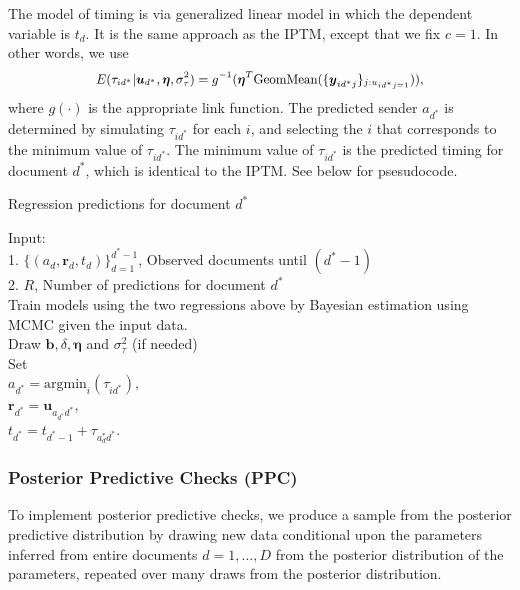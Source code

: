 \documentclass[twoside]{article}
\begin{document}
     The model of timing is via generalized linear model in which the dependent variable is $t_{d}$. It is the same approach as the IPTM, except that we fix $c=1$. In other words, we use
     \begin{equation*}
       	 \footnotesize
     E(\tau_{id^*}|\boldsymbol{u}_{d^*}, \boldsymbol{\eta}, \sigma_\tau^2) = g^{-1}(\boldsymbol{\eta}^T\mbox{GeomMean}(\{\boldsymbol{y}_{id^*j}\}_{j:u_{id^*j = 1}})),
     \label{eqn:predtime}
     \end{equation*}
     where $g(\cdot)$ is the appropriate link function. The predicted sender $a_{d^*}$ is determined by simulating $\tau_{id^*}$ for each $i$, and selecting the $i$ that corresponds to the minimum value of $\tau_{id^*}$. The minimum value of $\tau_{id^*}$ is the predicted timing for document $d^*$, which is identical to the IPTM. See below for psesudocode.
     \begin{algorithm}[ht]
     	\footnotesize
     	\SetAlgoLined
     	\caption{Regression predictions for document $d^*$}
     	Input:\\
	1.  $\{(a_d, \boldsymbol{r}_d,t_d)\}_{d=1}^{d^*-1}$, Observed documents until $(d^*-1)$ \\
     2. $R$, Number of predictions for document $d^*$\\
     
     	Train models using the two regressions above by Bayesian estimation using MCMC given the input data. \\
     	 {
     		Draw $\boldsymbol{b}, \delta, \boldsymbol{\eta}$  and $\sigma_\tau^2$ (if needed)\\
     		Set\\$a_{d^*} = \mbox{argmin}_{i}(\tau_{id^*}),$ \\
     		$\boldsymbol{r}_{d^*} = \boldsymbol{u}_{a_{d^*}d^*},$\\
     		$t_{d^*}=t_{d^*-1} + \tau_{a_d^* d^*}$.
     	}
     	\label{alg:docpredict}
     \end{algorithm}
     \subsubsection{Posterior Predictive Checks (PPC)}\label{subsubsec:Details on PPC}  
     To implement posterior predictive checks, we produce a sample from the posterior predictive distribution by drawing new data conditional upon the parameters inferred from entire documents $d=1,...,D$ from the posterior distribution of the parameters, repeated over many draws from the posterior distribution. 
     
\end{document}
